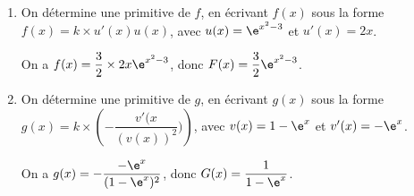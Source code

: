 \documentclass{standalone}
\begin{document}
\begin{enumerate}
\item On détermine une primitive de $f$, en écrivant $f(x)$ sous la forme $f(x)=k\times u'(x)u(x)$, avec $u(x)=\e^{x^2-3}$ et $u'(x)=2x$.

On a $f(x)=\dfrac{3}{2} \times 2x\e^{x^2-3}$, donc $F(x)=\dfrac{3}{2}\e^{x^2-3}$.


\item On détermine une primitive de $g$, en écrivant $g(x)$
sous la forme $g(x)=k\times \left(- \dfrac{v'(x}{(v(x))^2}) \right)$,
avec $v(x)=1-\e^{x}$ et $v'(x)=-\e^{x}$.

On a $g(x)=-\dfrac{-\e^{x}}{(1-\e^{x})^2}$, donc $G(x)=\dfrac{1}{1-\e^{x}}$.

\end{enumerate}
\end{document}
